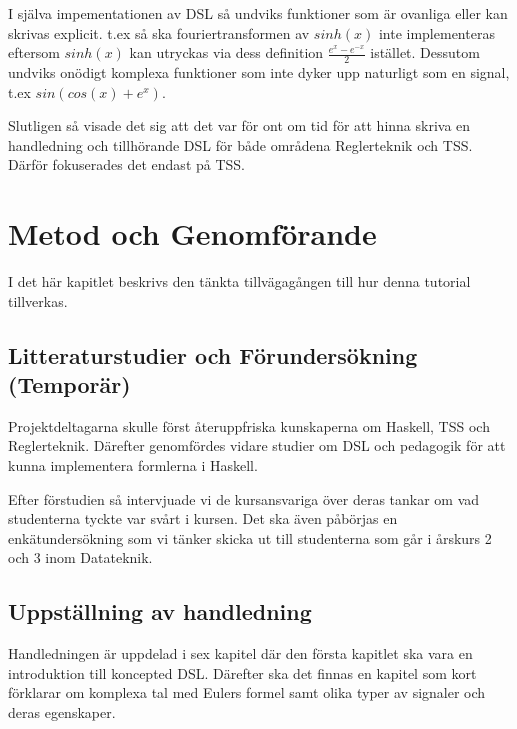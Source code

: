 \documentclass[]{article}
\begin{document}
I själva impementationen av DSL så undviks funktioner som är
ovanliga eller kan skrivas explicit. t.ex så ska fouriertransformen av
$sinh(x)$ inte implementeras eftersom $sinh(x)$ kan utryckas via dess
definition $\frac{e^{x} - e^{-x}}{2}$ istället.
Dessutom undviks onödigt komplexa funktioner som inte
dyker upp naturligt som en signal, t.ex $sin(cos(x)+e^x)$.

Slutligen så visade det sig att det var för ont om tid för att hinna
skriva en handledning och tillhörande DSL för både områdena Reglerteknik och TSS.
Därför fokuserades det endast på TSS.

\section{Metod och Genomförande}


I det här kapitlet beskrivs den tänkta tillvägagången till hur denna
tutorial tillverkas.

\subsection{Litteraturstudier och Förundersökning (Temporär)}


Projektdeltagarna skulle först återuppfriska kunskaperna om Haskell, TSS
och Reglerteknik. Därefter genomfördes vidare studier om DSL och pedagogik för
att kunna implementera formlerna i Haskell.

Efter förstudien så intervjuade vi de kursansvariga över deras tankar om vad
studenterna tyckte var svårt i kursen. Det ska även påbörjas en enkätundersökning
som vi tänker skicka ut till studenterna som går i årskurs 2 och 3 inom Datateknik.


\subsection{Uppställning av handledning}

Handledningen är uppdelad i sex kapitel %
där den första kapitlet ska vara en introduktion till koncepted DSL. Därefter ska det finnas
en kapitel som kort förklarar om komplexa tal med Eulers formel samt olika typer av
signaler och deras egenskaper.
\end{document}

